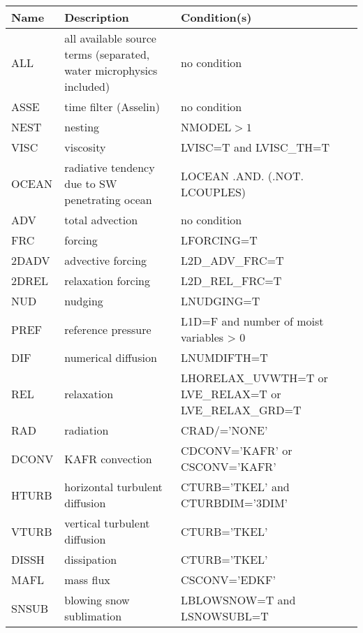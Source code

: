 \begin{longtable} {|p{}|p{}|p{}|}
\hline
Name & Description & Condition(s) \\
\hline \hline
\endhead
ALL    & all available source terms (separated,  water microphysics included) & no condition \\\hline \hline
ASSE   & time filter (Asselin)          & no condition                            \\\hline
NEST   & nesting                        & NMODEL$>1$                              \\\hline
VISC   & viscosity                      & LVISC=T and LVISC\_TH=T                 \\\hline
OCEAN  & radiative tendency due to SW penetrating ocean & LOCEAN .AND. (.NOT. LCOUPLES) \\\hline
ADV    & total advection                & no condition                            \\\hline
FRC    & forcing                        & LFORCING=T                              \\\hline
2DADV  & advective forcing              & L2D\_ADV\_FRC=T                         \\\hline
2DREL  & relaxation forcing             & L2D\_REL\_FRC=T                         \\\hline
NUD    & nudging                        & LNUDGING=T                              \\\hline
PREF   & reference pressure             & L1D=F and number of moist variables > 0 \\\hline
DIF    & numerical diffusion            & LNUMDIFTH=T                             \\\hline
REL    & relaxation                     & LHORELAX\_UVWTH=T or LVE\_RELAX=T or LVE\_RELAX\_GRD=T \\\hline
RAD    & radiation                      & CRAD/='NONE'                            \\\hline
DCONV  & KAFR convection                & CDCONV='KAFR' or CSCONV='KAFR'          \\\hline
HTURB  & horizontal turbulent diffusion & CTURB='TKEL' and CTURBDIM='3DIM'        \\\hline
VTURB  & vertical turbulent diffusion   & CTURB='TKEL'                            \\\hline
DISSH  & dissipation                    & CTURB='TKEL'                            \\\hline
MAFL   & mass flux                      & CSCONV='EDKF'                           \\\hline
SNSUB  & blowing snow sublimation       & LBLOWSNOW=T and LSNOWSUBL=T             \\\hline
\end{longtable}

